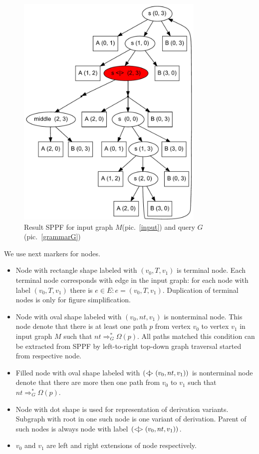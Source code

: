 \documentclass{sig-alternate} %
\begin{document}
\begin{figure}[h]
    \begin{center}
        \includegraphics[width=9cm]{dot/AnBn.pdf}
        \caption{Result SPPF for input graph $M$(pic.~\ref{input}) and query $G$(pic.~\ref{grammarG})}
        \label{SPPF}        
    \end{center}
\end{figure}

We use next markers for nodes.
\begin{itemize}
    \item Node with rectangle shape labeled with $(v_0, T, v_1)$ is terminal node. 
    Each terminal node corresponds with edge in the input graph: for each node with label $(v_0, T, v_1)$ there is $e\in E: e=(v_0,T,v_1)$.
    Duplication of terminal nodes is only for figure simplification.
    \item Node with oval shape labeled with $(v_0, nt, v_1)$ is nonterminal node. 
    This node denote that there is at least one path $p$ from vertex $v_0$ to vertex $v_1$ in input graph $M$ such that $nt \Rightarrow^*_G \Omega(p)$.
    All paths matched this condition can be extracted from SPPF by left-to-right top-down graph traversal started from respective node. 
    \item Filled node with oval shape labeled with $(<\mkern-11mu | \mkern-11mu> (v_0, nt, v_1))$ is nonterminal node denote that there are more then one path from $v_0$ to $v_1$ such that $nt \Rightarrow^*_G \Omega(p)$.
    \item Node with dot shape is used for representation of derivation variants.
    Subgraph with root in one such node is one variant of derivation.
    Parent of such nodes is always node with label $(<\mkern-9mu | \mkern-9mu> (v_0, nt, v_1))$.
    \item $v_0$ and $v_1$ are left and right extensions of node respectively.
\end{itemize}
\end{document}
